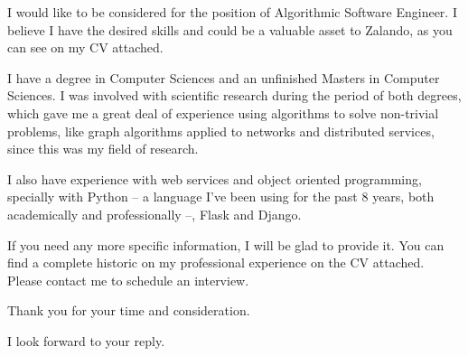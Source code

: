 \documentclass[10pt,stdletter,dateno,sigleft]{newlfm} %
\begin{document}
\begin{newlfm}


I would like to be considered for the position of Algorithmic Software Engineer. I believe I have the
desired skills and could be a valuable asset to Zalando, as you can see on my CV attached.

I have a degree in Computer Sciences and an unfinished Masters in Computer Sciences. I was involved with scientific research
during the period of both degrees, which gave me a great deal of experience using algorithms to solve
non-trivial problems, like graph algorithms applied to networks and distributed services, since this was
my field of research.

I also have experience with web services and object oriented programming, specially with Python -- a language I've
been using for the past 8 years, both academically and professionally --, Flask and Django.

If you need any more specific information, I will be glad to provide it. You can find a complete historic on my
professional experience on the CV attached. Please contact me to schedule an interview.

Thank you for your time and consideration.

I look forward to your reply.


\end{newlfm}
\end{document}
